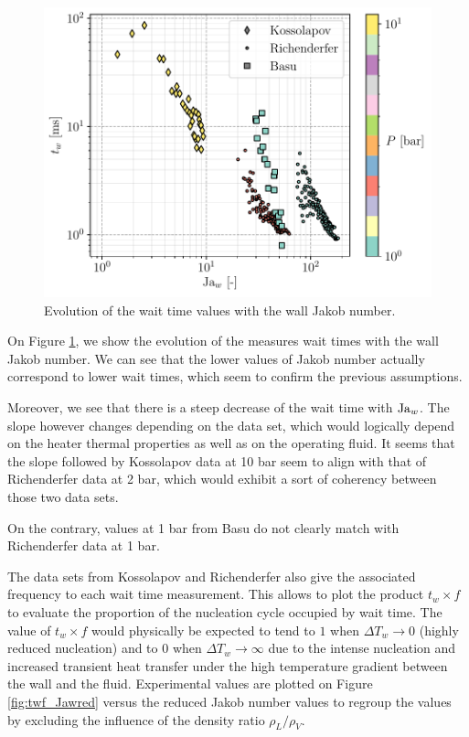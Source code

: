 \begin{figure}[!h]
\centering
\includegraphics[width=0.6\linewidth]{img/tw/Jaw_tw.pdf}
\caption{Evolution of the wait time values with the wall Jakob number.}
\label{fig:tw_Jaw}
\end{figure}

On Figure \ref{fig:tw_Jaw}, we show the evolution of the measures wait times with the wall Jakob number. We can see that the lower values of Jakob number actually correspond to lower wait times, which seem to confirm the previous assumptions.

\npar

Moreover, we see that there is a steep decrease of the wait time with $\mathrm{Ja}_{w}$. The slope however changes depending on the data set, which would logically depend on the heater thermal properties as well as on the operating fluid. It seems that the slope followed by Kossolapov data at 10 bar seem to align with that of Richenderfer data at 2 bar, which would exhibit a sort of coherency between those two data sets.

On the contrary, values at 1 bar from Basu do not clearly match with Richenderfer data at 1 bar.

\npar

The data sets from Kossolapov and Richenderfer also give the associated frequency to each wait time measurement. This allows to plot the product $t_{w} \times f$ to evaluate the proportion of the nucleation cycle occupied by wait time. The value of $t_{w} \times f$ would physically be expected to tend to $1$ when $\Delta T_{w} \to 0$ (highly reduced nucleation) and to $0$ when $\Delta T_{w} \to \infty$ due to the intense nucleation and increased transient heat transfer under the high temperature gradient between the wall and the fluid. Experimental values are plotted on Figure \ref{fig:twf_Jawred} versus the reduced Jakob number values to regroup the values by excluding the influence of the density ratio $\rho_{L}/\rho_{V}$.



